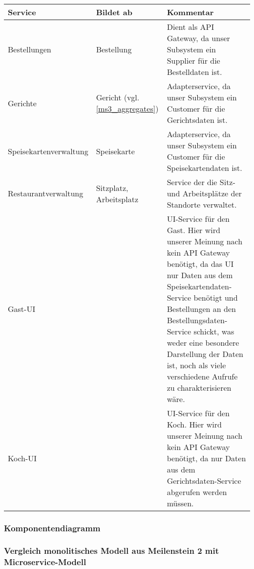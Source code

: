 \begin{tabu} to \linewidth {X|X|X}
\hline{}
Service &Bildet ab &Kommentar \\
\hline
Bestellungen &Bestellung &Dient als API Gateway, da
  unser Subsystem ein Supplier f\"ur die Bestelldaten ist.
  \\
\hline
Gerichte &Gericht (vgl. \ref{ms3_aggregates})
  &Adapterservice, da unser Subsystem ein Customer f\"ur
  die Gerichtsdaten ist.\\
\hline
Speisekartenverwaltung &Speisekarte &Adapterservice, da
  unser Subsystem ein Customer f\"ur die Speisekartendaten
  ist.\\
\hline
Restaurantverwaltung &Sitzplatz, Arbeitsplatz &Service der
  die Sitz- und Arbeitspl\"atze der Standorte verwaltet. \\
\hline
Gast-UI & &UI-Service f\"ur den Gast. Hier wird unserer
  Meinung nach kein API Gateway ben\"otigt, da das UI nur
  Daten aus dem Speisekartendaten-Service ben\"otigt und
  Bestellungen an den Bestellungsdaten-Service schickt,
  was weder eine besondere Darstellung der Daten ist, noch
  als viele verschiedene Aufrufe zu charakterisieren
  w\"are. \\
\hline
Koch-UI & &UI-Service f\"ur den Koch. Hier wird unserer
  Meinung nach kein API Gateway ben\"otigt, da nur Daten
  aus dem Gerichtsdaten-Service abgerufen werden m\"ussen.
  \\
\hline
\end{tabu}

\subsubsection{Komponentendiagramm}


\subsubsection{Vergleich monolitisches Modell aus
  Meilenstein 2 mit Microservice-Modell}

